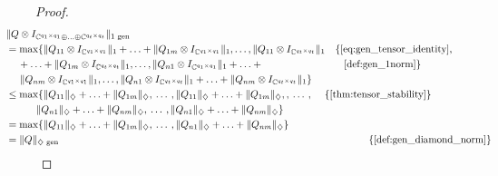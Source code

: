 \begin{proof}
  \begin{align*}
    & \hspace{-30pt} \lVert Q \otimes I_{\mathbb{C}^{q_1 \times q_1} \oplus \ldots \oplus \mathbb{C}^{q_t \times q_t}} \rVert_{1 \text{ gen}} \\
    & \hspace{-30pt}  = \max \{ \lVert Q_{11}  \otimes I_{\mathbb{C}^{q_1 \times q_1}}  \rVert_{1}  + \ldots +  \lVert Q_{1m}  \otimes I_{\mathbb{C}^{q_1 \times q_1}} \rVert_{1},  \ldots ,  \lVert Q_{11} \otimes I_{\mathbb{C}^{q_t \times q_t}} \rVert_{1}   \quad \{\text{\autoref{eq:gen_tensor_identity}, } \\
    & \hspace{-18pt}  + \ldots + \lVert Q_{1m} \otimes I_{\mathbb{C}^{q_t \times q_t}} \rVert_{1}, \ldots,  \lVert Q_{n1}  \otimes I_{\mathbb{C}^{q_1 \times q_1}}  \rVert_{1} + \ldots +  \hspace{80 pt} \text{\autoref{def:gen_1norm}} \} \\
    & \hspace{-16pt}\lVert Q_{nm}  \otimes I_{\mathbb{C}^{q_1 \times q_1}} \rVert_{1}, \ldots,  \lVert Q_{n1} \otimes I_{\mathbb{C}^{q_t \times q_t}} \rVert_{1} + \ldots + \lVert Q_{nm} \otimes I_{\mathbb{C}^{q_t \times q_t}} \rVert_{1} \} \\
    &  \hspace{-30pt}  \leq   \max \{ \|Q_{11}\|_{\diamondsuit} + \ldots + \|Q_{1m}\|_{\diamondsuit}, \hspace{2pt} \ldots \hspace{2pt},  \|Q_{11}\|_{\diamondsuit} + \ldots + \|Q_{1m}\|_{\diamondsuit}, , \hspace{2pt} \ldots \hspace{2pt},   \hspace{12 pt}  \{ \text{\autoref{thm:tensor_stability}}\}\\
    & \|Q_{n1}\|_{\diamondsuit} + \ldots + \|Q_{nm}\|_{\diamondsuit}, \hspace{2pt} \ldots \hspace{2pt}, \|Q_{n1}\|_{\diamondsuit} + \ldots + \|Q_{nm}\|_{\diamondsuit} \} \\
    &  \hspace{-30pt} = \max \{\|Q_{11}\|_{\diamondsuit} + \ldots + \|Q_{1m}\|_{\diamondsuit}, \hspace{2pt} \ldots \hspace{2pt}, \|Q_{n1}\|_{\diamondsuit} + \ldots + \|Q_{nm}\|_{\diamondsuit} \} \\
    & \hspace{-30pt}  = \lVert Q \rVert_{\diamondsuit \text{ gen}}  \hspace{308 pt}  \{ \text{\autoref{def:gen_diamond_norm}}\}
  \end{align*} 


\end{proof}
